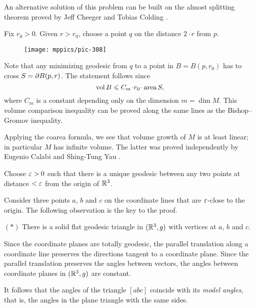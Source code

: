 An alternative solution of this problem can be built on the almost splitting theorem proved by  Jeff Cheeger and Tobias Colding \cite{cheeger-colding}.





Fix $r_0>0$.
Given $r>r_0$, choose a point $q$ on the distance $2\cdot r$ from $p$.

\begin{wrapfigure}{r}{35 mm}
\vskip-5mm
\centering
\texttt{[image: mppics/pic-308]}
\end{wrapfigure}

Note that any minimizing geodesic from $q$ to a point in $B=B(p,r_0)$
has to cross $S\z=\partial B(p,r)$.
The statement follows since  
\[\vol B\le C_m\cdot r_0\cdot \area S,\]
where $C_m$ is a constant depending only on the dimension $m=\dim M$.
This volume comparison inequality can be proved along the same lines as the Bishop--Gromov inequality.
\qeds


Applying the coarea formula, 
we see that volume growth of $M$ is at least linear; 
in particular $M$ has infinite volume.
The latter was proved independently 
by Eugenio Calabi 
and Shing-Tung Yau \cite{calabi,yau-ricci}.



Choose $\varepsilon>0$ such that there is a unique geodesic between any two points at distance $<\varepsilon$ from the origin of $\mathbb{R}^3$.

Consider three points $a$, $b$ and $c$ on the coordinate lines that are $\varepsilon$-close 
to the origin.
The following observation is the key to the proof.

\begin{cl}{$({*})$}
There is a solid flat geodesic triangle in $(\mathbb{R}^3,g)$ with vertices at $a$, $b$ and $c$.
\end{cl}

Since the coordinate planes are totally geodesic, 
the parallel translation along a coordinate line preserves the directions tangent to a coordinate plane.
Since the parallel translation preserves the angles between vectors, the angles between coordinate planes in $(\mathbb{R}^3,g)$ are constant.

It follows that the angles of the triangle $[abc]$ coincide with its \emph{model angles},
that is, the angles in the plane triangle with the same sides.

